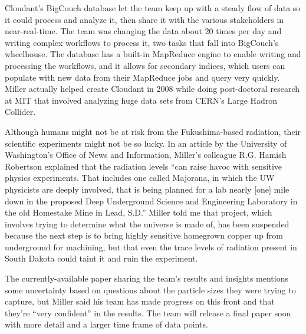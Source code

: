 Cloudant’s BigCouch database let the team keep up with a steady flow of data so it could process  and analyze it, then share it with the various stakeholders in near-real-time. The team was changing the data about 20 times per day and writing complex workflows to process it, two tasks that fall into BigCouch’s wheelhouse. The database has a built-in MapReduce engine to enable writing and processing the workflows, and it allows for secondary indices, which users can populate with new data from their MapReduce jobs and query very quickly. Miller actually helped create Cloudant in 2008 while doing post-doctoral research at MIT that involved analyzing huge data sets from CERN’s Large Hadron Collider.

Although humans might not be at risk from the Fukushima-based radiation, their scientific experiments might not be so lucky. In an article by the University of Washington’s Office of News and Information, Miller’s colleague R.G. Hamish Robertson explained that the radiation levels “can raise havoc with sensitive physics experiments. That includes one called Majorana, in which the UW physicists are deeply involved, that is being planned for a lab nearly [one] mile down in the proposed Deep Underground Science and Engineering Laboratory in the old Homestake Mine in Lead, S.D.” Miller told me that project, which involves trying to determine what the universe is made of, has been suspended because the next step is to bring highly sensitive homegrown copper up from underground for machining, but that even the trace levels of radiation present in South Dakota could taint it and ruin the experiment.

The currently-available paper sharing the team’s results and insights mentions some uncertainty based on questions about the particle sizes they were trying to capture, but Miller said his team has made progress on this front and that they’re “very confident” in the results. The team will release a final paper soon with more detail and a larger time frame of data points.
